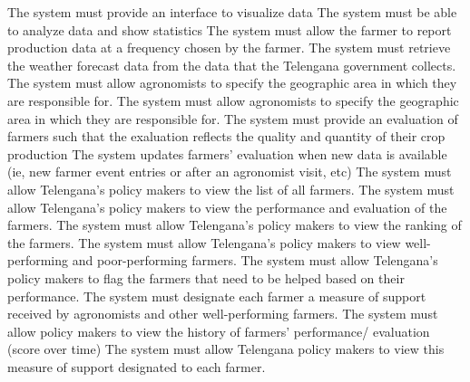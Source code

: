 \begin{itemize}
\begin{itemize}
 The system must provide an interface to visualize data
 The system must be able to analyze data and show statistics
 The system must allow the farmer to report production data at a frequency chosen by the farmer.
 The system must retrieve the weather forecast data from the data that the Telengana government collects.
 The system must allow agronomists to specify the geographic area in which they are responsible for.
 The system must allow agronomists to specify the geographic area in which they are responsible for.
  The system must provide an evaluation of farmers such that the exaluation reflects the quality and quantity of their crop production
  The system updates farmers' evaluation when new data is available (ie, new farmer event entries or after an agronomist visit, etc)
 The system must allow Telengana’s policy makers to view the list of all farmers.
 The system must allow Telengana’s policy makers to view the performance and evaluation of the farmers.
 The system must allow Telengana’s policy makers to view the ranking of the farmers.
 The system must allow Telengana’s policy makers to view well-performing and poor-performing farmers.
 The system must allow Telengana’s policy makers to flag the farmers that need to be helped based on their performance.
 The system must designate each farmer a measure of support received by agronomists and other well-performing farmers.
 The system must allow policy makers to view the history of farmers’ performance/ evaluation (score over time)
 The system must allow Telengana policy makers to view this measure of support designated to each farmer.
\end{itemize}



\end{itemize}
